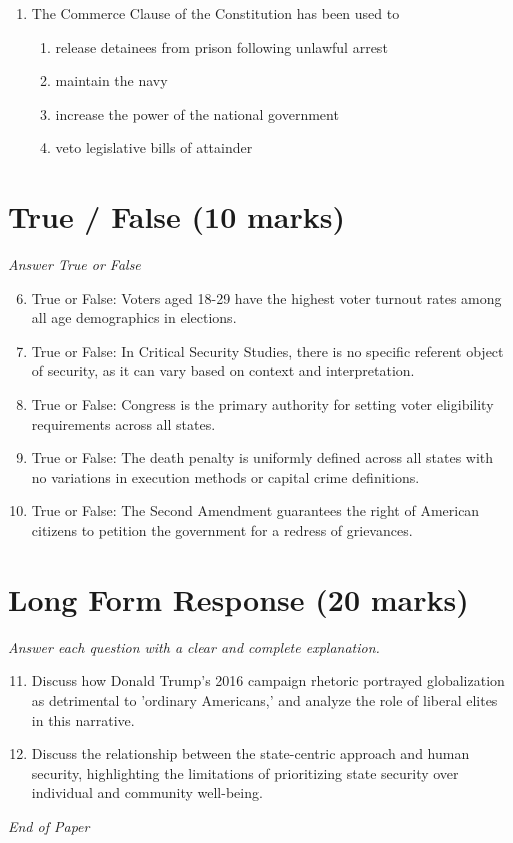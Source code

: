 \documentclass[12pt]{article}
\begin{document}
\begin{enumerate}[label=\arabic*.]
\begin{enumerate}[label=(\alph*)]
    \item Authorizing constitutional amendments
    \item Having representation in Congress
    \item Appealing to the president to adjudicate disputes
\end{enumerate}
\item The Commerce Clause of the Constitution has been used to
\begin{enumerate}[label=(\alph*)]
    \item release detainees from prison following unlawful arrest
    \item maintain the navy
    \item increase the power of the national government
    \item veto legislative bills of attainder
\end{enumerate}
\end{enumerate}

\section*{True / False (10 marks)}
\textit{Answer True or False}
\begin{enumerate}[label=\arabic*.]
\setcounter{enumi}{5}
\item True or False: Voters aged 18-29 have the highest voter turnout rates among all age demographics in elections.
\item True or False: In Critical Security Studies, there is no specific referent object of security, as it can vary based on context and interpretation.
\item True or False: Congress is the primary authority for setting voter eligibility requirements across all states.
\item True or False: The death penalty is uniformly defined across all states with no variations in execution methods or capital crime definitions.
\item True or False: The Second Amendment guarantees the right of American citizens to petition the government for a redress of grievances.
\end{enumerate}

\section*{Long Form Response (20 marks)}
\textit{Answer each question with a clear and complete explanation.}
\begin{enumerate}[label=\arabic*.]
\setcounter{enumi}{10}
\item Discuss how Donald Trump's 2016 campaign rhetoric portrayed globalization as detrimental to 'ordinary Americans,' and analyze the role of liberal elites in this narrative.
\item Discuss the relationship between the state-centric approach and human security, highlighting the limitations of prioritizing state security over individual and community well-being.
\end{enumerate}

\vfill
\noindent\textit{End of Paper}
\end{document}
